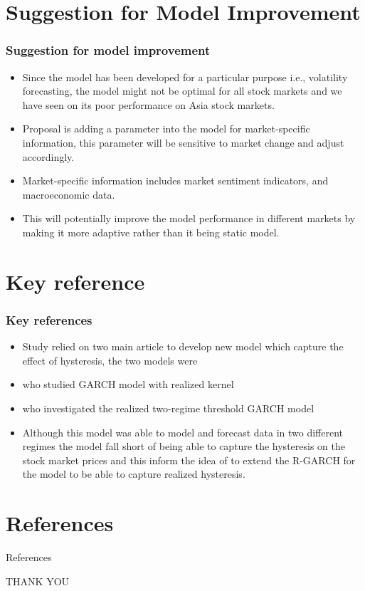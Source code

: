 \documentclass[unknownkeysallowed]{beamer}
\begin{document}
\section{Suggestion for Model Improvement}
\begin{frame}[plain]
	\frametitle{\textbf{Suggestion for model improvement}}
	\begin{itemize}
		\item Since the model has been developed for a particular purpose i.e., volatility forecasting, the model might not be optimal for all stock markets and we have seen on its poor performance on Asia stock markets. 
		\item Proposal is adding a parameter into the model for market-specific information, this parameter will be sensitive to market change and adjust accordingly.
		\item Market-specific information includes market sentiment indicators, and macroeconomic data.
		\item This will potentially improve the model performance in different markets by making it more adaptive rather than it being static model.
	\end{itemize}
\end{frame}
\section{Key reference}
\begin{frame}[plain]
	\frametitle{\textbf{Key references}}
	\begin{itemize}
		\item Study relied on two main article to develop new model which capture the effect of hysteresis, the two models were
		\item \cite{hansen2012realized} who studied GARCH model with realized kernel
		\item \cite{chen2019bayesian} who investigated the realized two-regime threshold GARCH model
		\item Although this model was able to model and forecast data in two different regimes the model fall short of being able to capture the hysteresis on the stock market prices and this inform the idea of to extend the R-GARCH for the model to be able to capture realized hysteresis.
	\end{itemize}
\end{frame}						
\section{References}
\begin{frame}{References}
   \small
	
	
	
\end{frame}
	
	\begin{frame}[plain]
		\begin{center}
			\LARGE{THANK YOU\\}
		\end{center}
	\end{frame}
\end{document}

